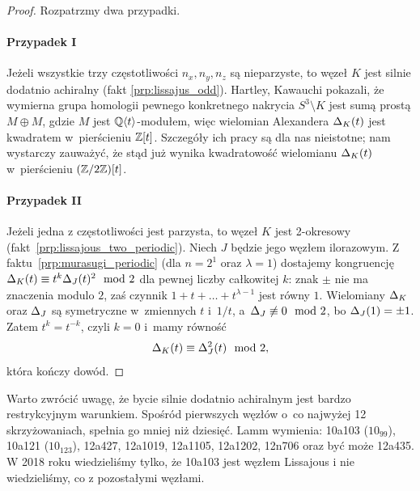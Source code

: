 \begin{proof}
    Rozpatrzmy dwa przypadki.

    \paragraph{Przypadek I}
    Jeżeli wszystkie trzy częstotliwości $n_x, n_y, n_z$ są nieparzyste, to węzeł $K$ jest silnie dodatnio achiralny (fakt \ref{prp:lissajus_odd}).
    Hartley, Kawauchi \cite{hartley1979} pokazali, że wymierna grupa homologii pewnego konkretnego nakrycia $S^3 \setminus K$ jest sumą prostą $M \oplus M$, gdzie $M$ jest $\mathbb Q\langle t \rangle$-modułem, więc wielomian Alexandera $\Delta_K(t)$ jest kwadratem w~pierścieniu $\mathbb Z[t]$.
    Szczegóły ich pracy są dla nas nieistotne; nam wystarczy zauważyć, że stąd już wynika kwadratowość wielomianu $\Delta_K(t)$ w~pierścieniu $(\mathbb Z/2\mathbb Z)[t]$.

    \paragraph{Przypadek II}
    Jeżeli jedna z częstotliwości jest parzysta, to węzeł $K$ jest 2-okresowy (fakt~\ref{prp:lissajous_two_periodic}).
    Niech $J$ będzie jego węzłem ilorazowym.
    Z faktu~\ref{prp:murasugi_periodic} (dla $n=2^1$ oraz $\lambda = 1$) dostajemy kongruencję $\Delta_K(t) \equiv t^k \Delta_J(t)^2 \mod 2$ dla pewnej liczby całkowitej $k$: znak $\pm$ nie ma znaczenia modulo $2$, zaś czynnik $1 + t + \ldots + t^{\lambda-1}$ jest równy $1$.
    Wielomiany $\Delta_K$ oraz $\Delta_J$ są symetryczne w~zmiennych $t$ i~$1/t$, a~$\Delta_J \not\equiv 0 \mod 2$, bo $\Delta_J(1) = \pm 1$.
    Zatem $t^k = t^{-k}$, czyli $k = 0$ i~mamy równość
    \begin{equation}
\label{eqn:lissajous_squared}%
        \alexander_K(t) \equiv \alexander^2_{J}(t) \mod 2,
    \end{equation}
    która kończy dowód.
\end{proof}

Warto zwrócić uwagę, że bycie silnie dodatnio achiralnym jest bardzo restrykcyjnym warunkiem.
Spośród pierwszych węzłów o~co najwyżej 12 skrzyżowaniach, spełnia go mniej niż dziesięć.
Lamm \cite{lamm2021} wymienia: 10a103 ($10_{99}$), 10a121 ($10_{123}$), 12a427, 12a1019, 12a1105, 12a1202, 12n706 oraz być może 12a435.
%
%
%
%
%
%
%
%
%
%
W 2018 roku wiedzieliśmy tylko, że 10a103 jest węzłem Lissajous i nie wiedzieliśmy, co z pozostałymi węzłami.

